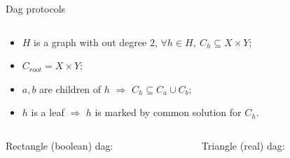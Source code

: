 \begin{frame}{Dag protocols}
    \vspace{-0.8cm}
    \begin{columns}[t]
        \begin{column}{0.58\textwidth}
            \begin{itemize}
                \item $H$ is a graph with out degree $2$, $\forall h \in H, ~ C_h \subseteq X \times Y$;
                \item $C_{root} = X \times Y$;
                \item $a, b$ are children of $h$ $\Rightarrow$ $C_{h} \subseteq C_{a} \cup C_{b}$;
                \item $h$ is a leaf $\Rightarrow$ $h$ is marked by common solution for $C_h$.
            \end{itemize}
        \end{column}

		\begin{column}{0.38\textwidth}
            \begin{center}
                
            \end{center}
		\end{column}
	\end{columns}

    \pause
    \begin{columns}[t]
		\begin{column}{0.48\textwidth}
            \begin{center}
                Rectangle (boolean) dag:
                \vspace{0.2cm}
                
            \end{center}
        \end{column}

		\begin{column}{0.48\textwidth}
            \begin{center}
                Triangle (real) dag:
                \vspace{0.2cm}
                
            \end{center}
		\end{column}
	\end{columns}
\end{frame}


